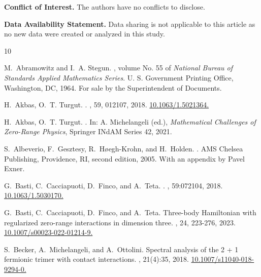 \documentclass[a4paper,11pt,reqno]{amsart}
\theoremstyle{definition}
\numberwithin{equation}{section}
\begin{document}
\vskip10pt\noindent
{\bf Conflict of Interest.} The authors have no conflicts to disclose.

\vskip10pt\noindent
{\bf Data Availability Statement.} Data sharing is not applicable to this article as no new data were created or analyzed in this study.



\begin{thebibliography}{10}

M.~Abramowitz and I.~A. Stegun.
, volume No. 55 of {\em National Bureau of Standards
  Applied Mathematics Series}.
\newblock U. S. Government Printing Office, Washington, DC, 1964.
\newblock For sale by the Superintendent of Documents.

H.~Akbas, O.~T. Turgut.
.
, 59, 012107, 2018. \href{https://doi.org/10.1063/1.5021364}{10.1063/1.5021364.}

H.~Akbas, O.~T. Turgut.
. In: A. Michelangeli (ed.), {\it Mathematical Challenges of Zero-Range Physics},
Springer INdAM Series 42, 2021.

S.~Albeverio, F.~Gesztesy, R.~H{\o}egh-Krohn, and H.~Holden.
.
\newblock AMS Chelsea Publishing, Providence, RI, second edition, 2005.
\newblock With an appendix by Pavel Exner.

G.~Basti, C.~Cacciapuoti, D.~Finco, and A.~Teta.
.
, 59:072104, 2018. \href{https://doi.org/10.1063/1.5030170}{10.1063/1.5030170.}

G.~Basti, C.~Cacciapuoti, D.~Finco, and A.~Teta.
\newblock Three-body Hamiltonian with regularized zero-range interactions in dimension three. 
, 24, 223-276, 2023. \href{https://doi.org/10.1007/s00023-022-01214-9}{10.1007/s00023-022-01214-9.}

S.~Becker, A.~Michelangeli, and A.~Ottolini.
\newblock Spectral analysis of the 2 + 1 fermionic trimer with contact interactions.
, 21(4):35, 2018. \href{https://doi.org/10.1007/s11040-018-9294-0}{10.1007/s11040-018-9294-0.}


\end{thebibliography}
\end{document}
